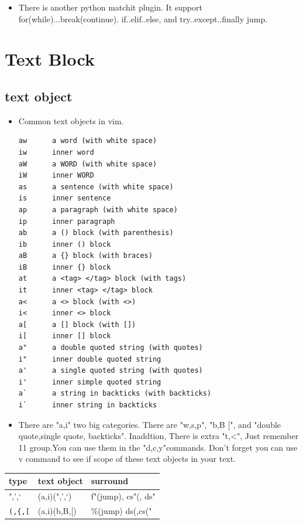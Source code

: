 \documentclass[a4paper,12pt,twoside]{book}
\begin{document}
\begin{itemize}
\begin{itemize}
	\item There is another python matchit plugin. It support for(while)...break(continue). if..elif..else, and try..except..finally jump.   
\end{itemize}

\section{Text Block}

\subsection{text object}
\begin{itemize}
		\item Common text objects in vim. 
\begin{verbatim}
aw		a word (with white space)
iw		inner word
aW		a WORD (with white space)
iW		inner WORD
as		a sentence (with white space)
is		inner sentence
ap		a paragraph (with white space)
ip		inner paragraph
ab		a () block (with parenthesis)
ib		inner () block
aB		a {} block (with braces)
iB		inner {} block
at		a <tag> </tag> block (with tags)
it		inner <tag> </tag> block
a<		a <> block (with <>)
i<		inner <> block
a[		a [] block (with [])
i[		inner [] block
a"		a double quoted string (with quotes)
i"		inner double quoted string
a'		a single quoted string (with quotes)
i'		inner simple quoted string
a`		a string in backticks (with backticks)
i`		inner string in backticks
\end{verbatim}
\item There are "a,i" two big categories. There are "w,s,p", "b,B $[$", and "double quote,single quote, backticks". Inaddtion, There is extra "t,<", Just remember 11 group.You can use them in the "d,c,y"commands. Don't forget you can use v command to see if scope of these text objects in your text.  

\end{itemize}



\begin{tabular}{p{}|p{}|p{}}
\hline 
type & text object & surround \\

\hline 
",',`  & (a,i)(",',`) & f"(jump), cs"(, ds" \\

\hline 
\verb=(,{,[= & (a,i)(b,B,$[$) & \%(jump) ds(,cs("  \\


\end{tabular}
\end{itemize}
\end{document}
